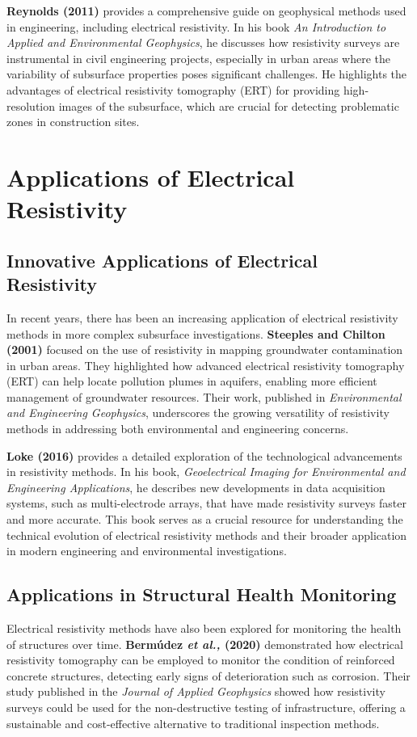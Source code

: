 \documentclass[12pt,a4paper]{report}
\begin{document}
\textbf{Reynolds (2011)} provides a comprehensive guide on geophysical methods used in engineering, including electrical resistivity. In his book \textit{An Introduction to Applied and Environmental Geophysics}, he discusses how resistivity surveys are instrumental in civil engineering projects, especially in urban areas where the variability of subsurface properties poses significant challenges. He highlights the advantages of electrical resistivity tomography (ERT) for providing high-resolution images of the subsurface, which are crucial for detecting problematic zones in construction sites.

\section{Applications of Electrical Resistivity}

\subsection{Innovative Applications of Electrical Resistivity}
In recent years, there has been an increasing application of electrical resistivity methods in more complex subsurface investigations. \textbf{Steeples and Chilton (2001)} focused on the use of resistivity in mapping groundwater contamination in urban areas. They highlighted how advanced electrical resistivity tomography (ERT) can help locate pollution plumes in aquifers, enabling more efficient management of groundwater resources. Their work, published in \textit{Environmental and Engineering Geophysics}, underscores the growing versatility of resistivity methods in addressing both environmental and engineering concerns.

\textbf{Loke (2016)} provides a detailed exploration of the technological advancements in resistivity methods. In his book, \textit{Geoelectrical Imaging for Environmental and Engineering Applications}, he describes new developments in data acquisition systems, such as multi-electrode arrays, that have made resistivity surveys faster and more accurate. This book serves as a crucial resource for understanding the technical evolution of electrical resistivity methods and their broader application in modern engineering and environmental investigations.

\subsection{Applications in Structural Health Monitoring}
Electrical resistivity methods have also been explored for monitoring the health of structures over time. \textbf{Bermúdez \textit{et al.,} (2020)} demonstrated how electrical resistivity tomography can be employed to monitor the condition of reinforced concrete structures, detecting early signs of deterioration such as corrosion. Their study published in the \textit{Journal of Applied Geophysics} showed how resistivity surveys could be used for the non-destructive testing of infrastructure, offering a sustainable and cost-effective alternative to traditional inspection methods.
\end{document}
